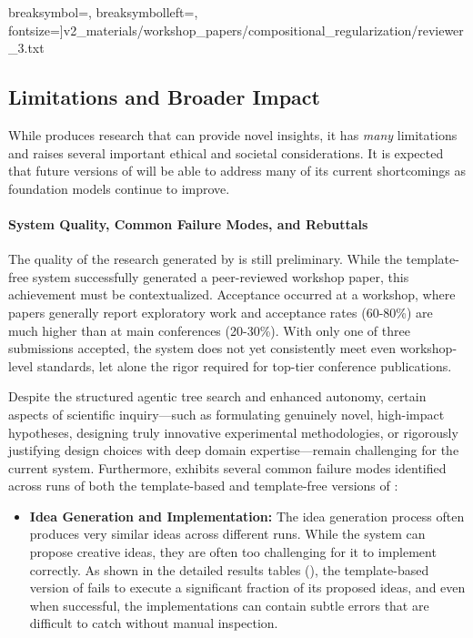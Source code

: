 \begin{appendices}
\begin{tcolorbox}
               breaksymbol={},
               breaksymbolleft={},
               fontsize=\scriptsize]{v2_materials/workshop_papers/compositional_regularization/reviewer_3.txt}
\end{tcolorbox}


\subsection{Limitations and Broader Impact}
\label{app:limitations}
While \ouralgo produces research that can provide novel insights, it has \textit{many} limitations and raises several important ethical and societal considerations. It is expected that future versions of \ouralgo will be able to address many of its current shortcomings as foundation models continue to improve.

\paragraph{System Quality, Common Failure Modes, and Rebuttals}
The quality of the research generated by \ouralgo is still preliminary. While the template-free system successfully generated a peer-reviewed workshop paper, this achievement must be contextualized. Acceptance occurred at a workshop, where papers generally report exploratory work and acceptance rates (60-80\%) are much higher than at main conferences (20-30\%). With only one of three submissions accepted, the system does not yet consistently meet even workshop-level standards, let alone the rigor required for top-tier conference publications.

Despite the structured agentic tree search and enhanced autonomy, certain aspects of scientific inquiry—such as formulating genuinely novel, high-impact hypotheses, designing truly innovative experimental methodologies, or rigorously justifying design choices with deep domain expertise—remain challenging for the current system. Furthermore, \ouralgo exhibits several common failure modes identified across runs of both the template-based and template-free versions of \ouralgo:

\begin{itemize}
    \item \textbf{Idea Generation and Implementation:} The idea generation process often produces very similar ideas across different runs. While the system can propose creative ideas, they are often too challenging for it to implement correctly. As shown in the detailed results tables (), the template-based version of \ouralgo fails to execute a significant fraction of its proposed ideas, and even when successful, the implementations can contain subtle errors that are difficult to catch without manual inspection.


\end{itemize}
\end{appendices}
